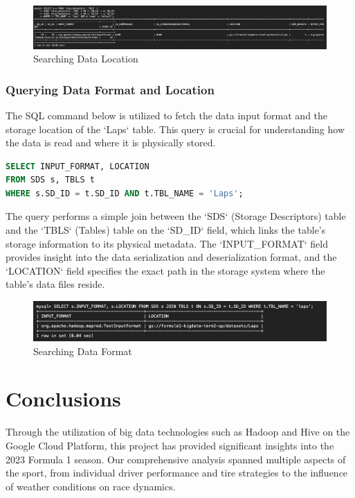 \documentclass{article}
\begin{document}
\begin{figure}[H]
    \centering
    \includegraphics[width=\textwidth]{hive1.png}
    \caption{Searching Data Location}
\end{figure}

\subsubsection{Querying Data Format and Location}
The SQL command below is utilized to fetch the data input format and the storage location of the `Laps` table. This query is crucial for understanding how the data is read and where it is physically stored.

\begin{lstlisting}[language=SQL]
SELECT INPUT_FORMAT, LOCATION
FROM SDS s, TBLS t
WHERE s.SD_ID = t.SD_ID AND t.TBL_NAME = 'Laps';
\end{lstlisting}

The query performs a simple join between the `SDS` (Storage Descriptors) table and the `TBLS` (Tables) table on the `SD\_ID` field, which links the table's storage information to its physical metadata. The `INPUT\_FORMAT` field provides insight into the data serialization and deserialization format, and the `LOCATION` field specifies the exact path in the storage system where the table's data files reside.

\begin{figure}[H]
    \centering
    \includegraphics[width=\textwidth]{hive2.png}
    \caption{Searching Data Format}
\end{figure}


\section{Conclusions}
Through the utilization of big data technologies such as Hadoop and Hive on the Google Cloud Platform, this project has provided significant insights into the 2023 Formula 1 season. Our comprehensive analysis spanned multiple aspects of the sport, from individual driver performance and tire strategies to the influence of weather conditions on race dynamics.
\end{document}

